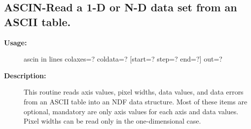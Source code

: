 \subsection{ASCIN-\label{ASCIN}Read a 1-D or N-D data set from an ASCII table.}
\begin{description}

\item [{\bf Usage:}]

   ascin in lines colaxes=? coldata=? [start=? step=? end=?] out=?


\item [{\bf Description:}]
   This routine reads axis values, pixel widths, data values, and
   data errors from an ASCII table into an NDF data structure.
   Most of these items are optional, mandatory are only
   axis values for each axis and data values. Pixel widths can be
   read only in the one-dimensional case.



\end{description}
